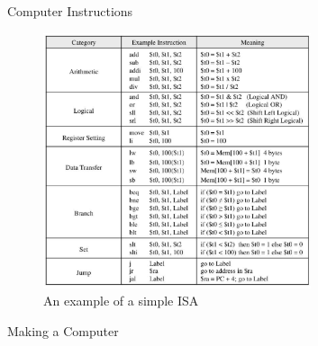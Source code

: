 \documentclass[]{beamer}
\begin{document}
\begin{frame}{Computer Instructions}
    \begin{figure}
        \centering
        \includegraphics[width=0.7\textwidth]{imgs/vis_6.png}
        \\
        An example of a simple ISA
    \end{figure}
\end{frame}


\begin{frame}{Making a Computer}


\end{frame}
\end{document}
